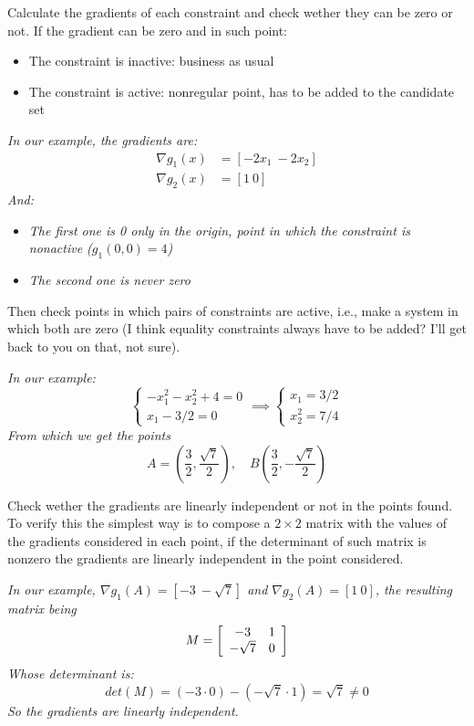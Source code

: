 Calculate the gradients of each constraint and check wether they can be zero or not. If the gradient can be zero and in such point: 
\begin{itemize}
	\item The constraint is inactive: business as usual
	
	\item The constraint is active: nonregular point, has to be added to the candidate set
\end{itemize}

\textit{In our example, the gradients are: 
\begin{align*}
	\nabla g_1 (x) & = \left[ - 2 x_1 \  - 2 x_2 \right] \\
	\nabla g_2 (x) & = \left[ 1 \ 0 \right]
\end{align*}
And:}
\begin{itemize}
	\item \textit{The first one is 0 only in the origin, point in which the constraint is nonactive ($ g_1 (0,0) = 4 $)}
	
	\item \textit{The second one is never zero}
\end{itemize}

Then check points in which pairs of constraints are active, i.e., make a system in which both are zero (I think equality constraints always have to be added? I'll get back to you on that, not sure).

\textit{In our example:
$$
\begin{cases}
	-x_1^2 - x_2^2 + 4 = 0 \\
	x_1 - 3/2 = 0 
\end{cases}
\implies
\begin{cases}
	x_1 = 3/2 \\
	x_2^2 = 7/4
\end{cases}
$$
From which we get the points
$$ A = \left(\frac{3}{2}, \frac{\sqrt{7}}{2}\right), \quad B \left(\frac{3}{2}, - \frac{\sqrt{7}}{2}\right) $$}

Check wether the gradients are linearly independent or not in the points found. To verify this the simplest way is to compose a $2 \times 2$ matrix with the values of the gradients considered in each point, if the determinant of such matrix is nonzero the gradients are linearly independent in the point considered.

\textit{In our example, $\nabla g_1 (A) = \left[- 3 \ -\sqrt{7}\right]$ and $\nabla g_2 (A) = \left[1 \ 0 \right]$, the resulting matrix being
$$
M = \left[\begin{array}{c c}
	-3 & 1 \\ -\sqrt{7} & 0
\end{array} \right]
$$
Whose determinant is: 
$$ det(M) = (-3 \cdot 0) - (-\sqrt{7} \cdot 1) = \sqrt{7} \neq 0$$
So the gradients are linearly independent.}

